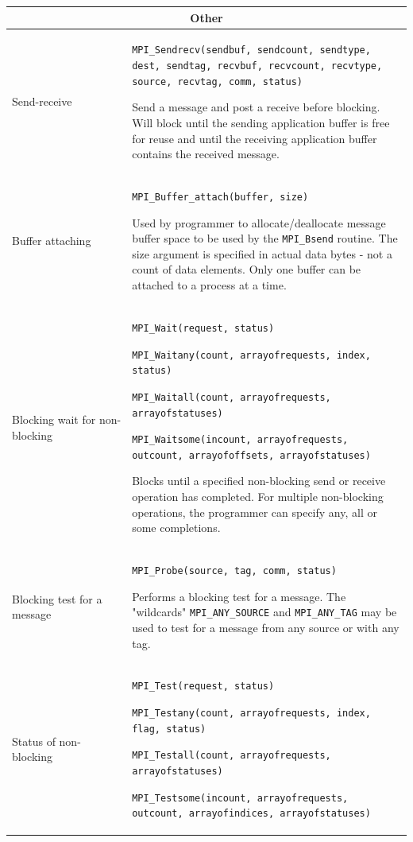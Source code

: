 \begin{tabular}{|p{0.3\linewidth}|p{0.75\linewidth}|}
\hline
\multicolumn{2}{|c|}{\textbf{Other}} \\
\hline
Send-receive & \texttt{MPI\_Sendrecv(sendbuf, sendcount, sendtype, dest, sendtag, recvbuf, recvcount, recvtype, source, recvtag, comm, status)} 

Send a message and post a receive before blocking. Will block until the sending application buffer is free for reuse and until the receiving application buffer contains the received message.  \\ 
\hline
Buffer attaching & \texttt{MPI\_Buffer\_attach(buffer, size)}

Used by programmer to allocate/deallocate message buffer space to be used by the \texttt{MPI\_Bsend} routine. The size argument is specified in actual data bytes - not a count of data elements. Only one buffer can be attached to a process at a time. \\ 

\hline
Blocking wait for non-blocking & 
\texttt{MPI\_Wait(request, status)}

\texttt{MPI\_Waitany(count, arrayofrequests, index, status)}

\texttt{MPI\_Waitall(count, arrayofrequests, arrayofstatuses)}

\texttt{MPI\_Waitsome(incount, arrayofrequests, outcount, arrayofoffsets, arrayofstatuses)}

Blocks until a specified non-blocking send or receive operation has completed. For multiple non-blocking operations, the programmer can specify any, all or some completions.  \\

\hline
Blocking test for a message &
\texttt{MPI\_Probe(source, tag, comm, status)}

Performs a blocking test for a message. The "wildcards" \texttt{MPI\_ANY\_SOURCE} and \texttt{MPI\_ANY\_TAG} may be used to test for a message from any source or with any tag. \\

\hline
Status of non-blocking & 
\texttt{MPI\_Test(request, status)}

\texttt{MPI\_Testany(count, arrayofrequests, index, flag, status)}

\texttt{MPI\_Testall(count, arrayofrequests, arrayofstatuses)}

\texttt{MPI\_Testsome(incount, arrayofrequests, outcount, arrayofindices, arrayofstatuses)}


\end{tabular}

